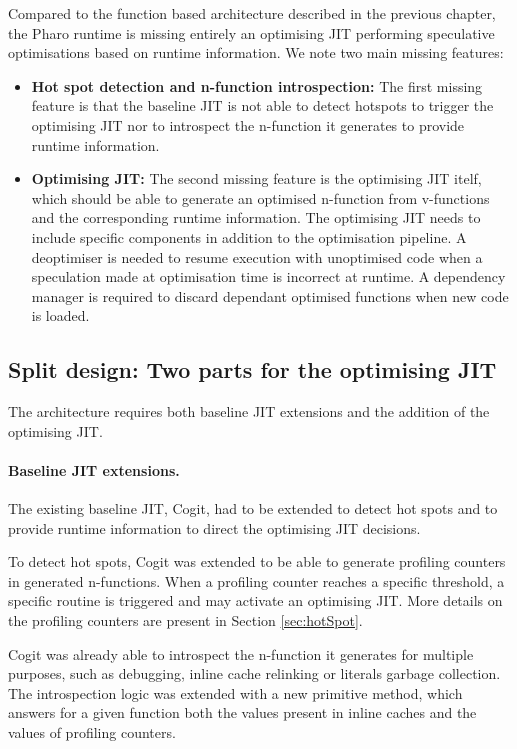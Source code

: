 \documentclass[a4paper,12pt,twoside]{../includes/ThesisStyle}
\begin{document}
Compared to the function based architecture described in the previous chapter, the Pharo runtime is missing entirely an optimising JIT performing speculative optimisations based on runtime information. We note two main missing features:
\begin{itemize}
	\item \textbf{Hot spot detection and n-function introspection:} The first missing feature is that the baseline JIT is not able to detect hotspots to trigger the optimising JIT nor to introspect the n-function it generates to provide runtime information. 
	\item \textbf{Optimising JIT:} The second missing feature is the optimising JIT itelf, which should be able to generate an optimised n-function from v-functions and the corresponding runtime information. The optimising JIT needs to include specific components in addition to the optimisation pipeline. A deoptimiser is needed to resume execution with unoptimised code when a speculation made at optimisation time is incorrect at runtime. A dependency manager is required to discard dependant optimised functions when new code is loaded.
\end{itemize}

\subsection{Split design: Two parts for the optimising JIT}
\label{sec:splitDesign}

The architecture requires both baseline JIT extensions and the addition of the optimising JIT.

\paragraph{Baseline JIT extensions.}
The existing baseline JIT, Cogit, had to be extended to detect hot spots and to provide runtime information to direct the optimising JIT decisions. 

To detect hot spots, Cogit was extended to be able to generate profiling counters in generated n-functions. When a profiling counter reaches a specific threshold, a specific routine is triggered and may activate an optimising JIT. More details on the profiling counters are present in Section \ref{sec:hotSpot}.

Cogit was already able to introspect the n-function it generates for multiple purposes, such as debugging, inline cache relinking or literals garbage collection. The introspection logic was extended with a new primitive method, which answers for a given function both the values present in inline caches and the values of profiling counters.
\end{document}
